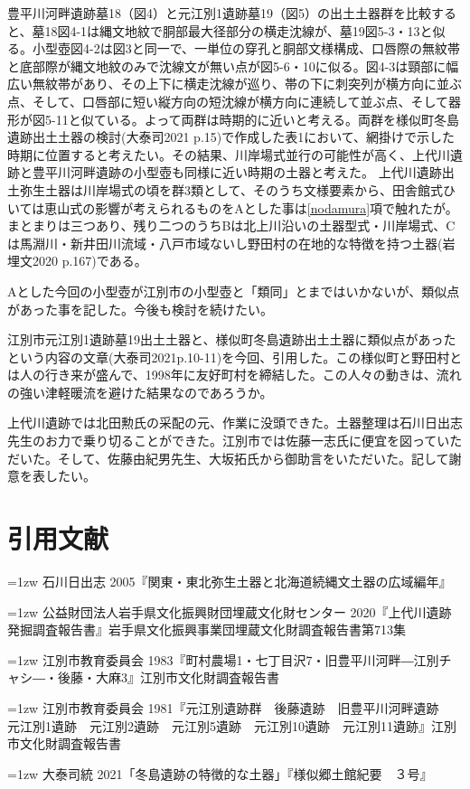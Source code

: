 \documentclass[a4j,11pt,twocolumn,openany]{jsbook}
\begin{document}
豊平川河畔遺跡墓18（図4）と元江別1遺跡墓19（図5）の出土土器群を比較すると、墓18図4-1は縄文地紋で胴部最大径部分の横走沈線が、墓19図5-3・13と似る。小型壺図4-2は図3と同一で、一単位の穿孔と胴部文様構成、口唇際の無紋帯と底部際が縄文地紋のみで沈線文が無い点が図5-6・10に似る。図4-3は頸部に幅広い無紋帯があり、その上下に横走沈線が巡り、帯の下に刺突列が横方向に並ぶ点、そして、口唇部に短い縦方向の短沈線が横方向に連続して並ぶ点、そして器形が図5-11と似ている。よって両群は時期的に近いと考える。両群を様似町冬島遺跡出土土器の検討(大泰司2021 p.15)で作成した表1において、網掛けで示した時期に位置すると考えたい。その結果、川岸場式並行の可能性が高く、上代川遺跡と豊平川河畔遺跡の小型壺も同様に近い時期の土器と考えた。
上代川遺跡出土弥生土器は川岸場式の頃を群3類として、そのうち文様要素から、田舎館式ひいては恵山式の影響が考えられるものをAとした事は\ref{nodamura}項で触れたが。まとまりは三つあり、残り二つのうちBは北上川沿いの土器型式・川岸場式、Cは馬淵川・新井田川流域・八戸市域ないし野田村の在地的な特徴を持つ土器(岩埋文2020 p.167)である。

Aとした今回の小型壺が江別市の小型壺と「類同」とまではいかないが、類似点があった事を記した。今後も検討を続けたい。

江別市元江別1遺跡墓19出土土器と、様似町冬島遺跡出土土器に類似点があったという内容の文章(大泰司2021p.10-11)を今回、引用した。この様似町と野田村とは人の行き来が盛んで、1998年に友好町村を締結した。この人々の動きは、流れの強い津軽暖流を避けた結果なのであろうか。

上代川遺跡では北田勲氏の采配の元、作業に没頭できた。土器整理は石川日出志先生のお力で乗り切ることができた。江別市では佐藤一志氏に便宜を図っていただいた。そして、佐藤由紀男先生、大坂拓氏から御助言をいただいた。記して謝意を表したい。

\section*{引用文献}

{\small
	\hangindent=1zw
	\noindent
	石川日出志 2005『関東・東北弥生土器と北海道続縄文土器の広域編年』
	
	\hangindent=1zw
	\noindent
	公益財団法人岩手県文化振興財団埋蔵文化財センター 2020『上代川遺跡発掘調査報告書』岩手県文化振興事業団埋蔵文化財調査報告書第713集
	
	\hangindent=1zw
	\noindent
	江別市教育委員会 1983『町村農場1・七丁目沢7・旧豊平川河畔―江別チャシ―・後藤・大麻3』江別市文化財調査報告書
	
	\hangindent=1zw
	\noindent
	江別市教育委員会 1981『元江別遺跡群　後藤遺跡　旧豊平川河畔遺跡　元江別1遺跡　元江別2遺跡　元江別5遺跡　元江別10遺跡　元江別11遺跡』江別市文化財調査報告書
	
	\hangindent=1zw
	\noindent
	大泰司統 2021「冬島遺跡の特徴的な土器」『様似郷土館紀要　３号』
	
}
\end{document}
